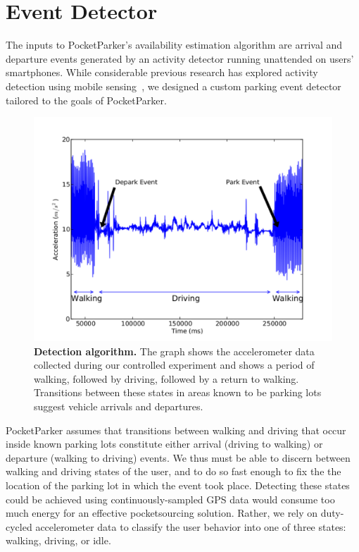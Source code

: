 \section{Event Detector}

The inputs to PocketParker's availability estimation algorithm are arrival
and departure events generated by an activity detector running unattended on
users' smartphones.  While considerable previous research has explored
activity detection using mobile sensing~\cite{Constandache:2010:DYS,
Keally:2011:PTP, Reddy:2010:UMP, Yang:2011:DDP, Wang:2009:FEE}, we designed a
custom parking event detector tailored to the goals of PocketParker. 

\begin{figure}[t]
  \centering
  \includegraphics[width=0.8\columnwidth]{./figures/detection-cropped.pdf}

  \caption{\textbf{Detection algorithm.} The graph shows the accelerometer
    data collected during our controlled experiment and shows a period of
    walking, followed by driving, followed by a return to walking.
    Transitions between these states in areas known to be parking lots
  suggest vehicle arrivals and departures.}

  \label{fig-detection}
\end{figure}


PocketParker assumes that transitions between walking and driving that occur
inside known parking lots constitute either arrival (driving to walking) or
departure (walking to driving) events.  We thus must be able to discern
between walking and driving states of the user, and to do so fast enough to
fix the the location of the parking lot in which the event took place.
Detecting these states could be achieved using continuously-sampled GPS data
would consume too much energy for an effective pocketsourcing solution.
Rather, we rely on duty-cycled accelerometer data to classify the user
behavior into one of three states: walking, driving, or idle.


